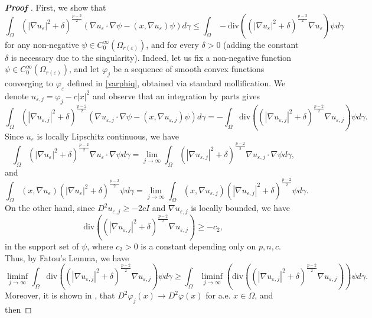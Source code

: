 \documentclass[12pt]{amsart}
\newcommand{\1}{\mathbf 1}
\begin{document}
\begin{proof}[\bf Proof ]
First, we show that
\begin{equation}\label{3-12}
\int_\Omega (|\nabla u_\varepsilon|^2+\delta)^{\frac{p-2}{2}}( \nabla u_\varepsilon \cdot \nabla \psi-(x,\nabla u_\varepsilon)\psi) d\gamma \leq \int_{\Omega}-\mathrm{div} \left((|\nabla u_\varepsilon|^2+\delta)^{\frac{p-2}{2}} \nabla u_\varepsilon\right)  \psi d\gamma
\end{equation}
for any non-negative $\psi\in C^{\infty}_0(\Omega_{r(\varepsilon)})$, and for every $\delta>0$ (adding the constant $\delta$ is necessary due to the singularity).
Indeed, let us fix a non-negative function $\psi \in C^{\infty}_0(\Omega_{r(\varepsilon)})$, and let $\varphi_j$ be a sequence of smooth convex functions converging to $\varphi_\varepsilon$ defined in \eqref{varphiq}, obtained via standard mollification. We denote $u_{\varepsilon,j}=\varphi_j-c|x|^2$ and observe that  an integration by parts gives
\[
\int_{\Omega}  (|\nabla u_{\varepsilon,j}|^2+\delta)^{\frac{p-2}{2}} (\nabla u_{\varepsilon,j} \cdot \nabla\psi  -(x,\nabla u_{\varepsilon,j}) \psi) d\gamma=-\int_\Omega \mathrm{div} \left((|\nabla u_{\varepsilon,j}|^2+\delta)^{\frac{p-2}{2}} \nabla u_{\varepsilon,j}\right) \psi d\gamma.
\]
Since $u_\varepsilon$ is locally Lipschitz continuous, we have
\[
\int_\Omega (|\nabla u_{\varepsilon}|^2+\delta)^{\frac{p-2}{2}} \nabla u_{\varepsilon} \cdot \nabla \psi d\gamma = \mathop{\lim}_{j\rightarrow \infty} \int_\Omega (|\nabla u_{\varepsilon,j}|^2+\delta)^{\frac{p-2}{2}} \nabla u_{\varepsilon,j} \cdot \nabla\psi d\gamma,
\]
and
\[
\int_{\Omega} (x,\nabla u_\varepsilon)(|\nabla u_{\varepsilon}|^2+\delta)^{\frac{p-2}{2}}\psi d\gamma = \mathop{\lim}_{j\rightarrow \infty} \int_{\Omega} (x,\nabla u_{\varepsilon,j})(|\nabla u_{\varepsilon,j}|^2+\delta)^{\frac{p-2}{2}}\psi d\gamma.
\]
On the other hand, since $D^2 u_{\varepsilon,j}\geq -2c I$ and $\nabla u_{\varepsilon,j}$ is locally bounded, we have
\[
\mathrm{div} \left((|\nabla u_{\varepsilon,j}|^2+\delta)^{\frac{p-2}{2}} \nabla u_{\varepsilon,j}\right)  \geq -c_2,
\]
in the support set of $\psi$, where $c_2>0$ is a constant depending only on $p,n,c$. Thus, by Fatou's Lemma, we have
\[
\mathop{\lim \inf}_{j\rightarrow \infty} \int_\Omega \mathrm{div} \left((|\nabla u_{\varepsilon,j}|^2+\delta)^{\frac{p-2}{2}} \nabla u_{\varepsilon,j}\right)  \psi d\gamma \geq  \int_\Omega \mathop{\lim \inf}_{j\rightarrow \infty}\left(\mathrm{div} ((|\nabla u_{\varepsilon,j}|^2+\delta)^{\frac{p-2}{2}} \nabla u_{\varepsilon,j}) \right) \psi d\gamma.
\]
Moreover, it is shown in \cite[p.242]{Evans1992}, that $D^2\varphi_j(x)\rightarrow D^2\varphi(x)$ for a.e. $x\in \Omega$, and then

\end{proof}
\end{document}
